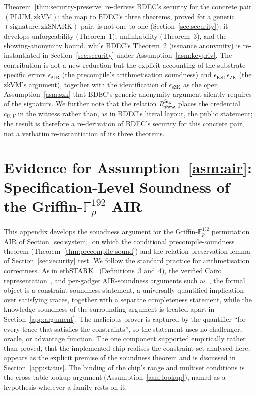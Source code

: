 \begin{remark}\label{rem:reinstantiation}
Theorem~\ref{thm:security-preserve} re-derives BDEC's security for the concrete pair $(\text{PLUM},\text{zkVM})$; the map to BDEC's three theorems, proved for a generic $(\text{signature},\text{zkSNARK})$ pair, is not one-to-one (Section~\ref{sec:security}): it develops unforgeability (Theorem~1), unlinkability (Theorem~3), and the showing-anonymity bound, while BDEC's Theorem~2 (issuance anonymity) is re-instantiated in Section~\ref{sec:security} under Assumption~\ref{asm:keypriv}. The contribution is not a new reduction but the explicit accounting of the substrate-specific errors $\epsilon_{\mathrm{AIR}}$ (the precompile's arithmetisation soundness) and $\epsilon_{\mathrm{KS}},\epsilon_{\mathrm{ZK}}$ (the zkVM's argument), together with the identification of $\epsilon_{\mathrm{sZK}}$ as the open Assumption~\ref{asm:szk} that BDEC's generic anonymity argument silently requires of the signature. We further note that the relation $R^{\mathsf{Sig}}_{\mathsf{show}}$ places the credential $c_{U,V}$ in the witness rather than, as in BDEC's literal layout, the public statement; the result is therefore a re-derivation of BDEC's security for this concrete pair, not a verbatim re-instantiation of its three theorems.
\end{remark}

\section{Evidence for Assumption~\ref{asm:air}: Specification-Level Soundness of the Griffin-$\mathbb{F}_p^{192}$ AIR}\label{app:proofs}
This appendix develops the soundness argument for the Griffin-$\mathbb{F}_p^{192}$ permutation AIR of Section~\ref{sec:system}, on which the conditional precompile-soundness theorem (Theorem~\ref{thm:precompile-sound}) and the relation-preservation lemma of Section~\ref{sec:security} rest. We follow the standard practice for arithmetisation correctness. As in ethSTARK~\cite{ethstark} (Definitions~3 and~4), the verified Cairo representation~\cite{cairoverify}, and per-gadget AIR-soundness arguments such as~\cite{divremair}, the formal object is a constraint-soundness statement, a universally quantified implication over satisfying traces, together with a separate completeness statement, while the knowledge-soundness of the surrounding argument is treated apart in Section~\ref{app:argument}. The malicious prover is captured by the quantifier ``for every trace that satisfies the constraints'', so the statement uses no challenger, oracle, or advantage function. The one component supported empirically rather than proved, that the implemented chip realises the constraint set analysed here, appears as the explicit premise of the soundness theorem and is discussed in Section~\ref{app:status}. The binding of the chip's range and multiset conditions is the cross-table lookup argument (Assumption~\ref{asm:lookup}), named as a hypothesis wherever a family rests on it.

